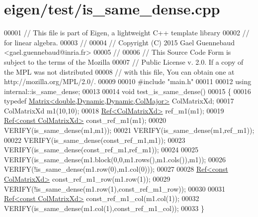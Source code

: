 \hypertarget{eigen_2test_2is__same__dense_8cpp_source}{}\section{eigen/test/is\+\_\+same\+\_\+dense.cpp}
\label{eigen_2test_2is__same__dense_8cpp_source}

\begin{DoxyCode}
00001 \textcolor{comment}{// This file is part of Eigen, a lightweight C++ template library}
00002 \textcolor{comment}{// for linear algebra.}
00003 \textcolor{comment}{//}
00004 \textcolor{comment}{// Copyright (C) 2015 Gael Guennebaud <gael.guennebaud@inria.fr>}
00005 \textcolor{comment}{//}
00006 \textcolor{comment}{// This Source Code Form is subject to the terms of the Mozilla}
00007 \textcolor{comment}{// Public License v. 2.0. If a copy of the MPL was not distributed}
00008 \textcolor{comment}{// with this file, You can obtain one at http://mozilla.org/MPL/2.0/.}
00009 
00010 \textcolor{preprocessor}{#include "main.h"}
00011 
00012 \textcolor{keyword}{using} internal::is\_same\_dense;
00013 
00014 \textcolor{keywordtype}{void} test\_is\_same\_dense()
00015 \{
00016   \textcolor{keyword}{typedef} \hyperlink{group___core___module_class_eigen_1_1_matrix}{Matrix<double,Dynamic,Dynamic,ColMajor>} ColMatrixXd;
00017   ColMatrixXd m1(10,10);
00018   \hyperlink{group___core___module_class_eigen_1_1_ref}{Ref<ColMatrixXd>} ref\_m1(m1);
00019   \hyperlink{group___core___module_class_eigen_1_1_ref}{Ref<const ColMatrixXd>} const\_ref\_m1(m1);
00020   VERIFY(is\_same\_dense(m1,m1));
00021   VERIFY(is\_same\_dense(m1,ref\_m1));
00022   VERIFY(is\_same\_dense(const\_ref\_m1,m1));
00023   VERIFY(is\_same\_dense(const\_ref\_m1,ref\_m1));
00024   
00025   VERIFY(is\_same\_dense(m1.block(0,0,m1.rows(),m1.cols()),m1));
00026   VERIFY(!is\_same\_dense(m1.row(0),m1.col(0)));
00027   
00028   \hyperlink{group___core___module_class_eigen_1_1_ref}{Ref<const ColMatrixXd>} const\_ref\_m1\_row(m1.row(1));
00029   VERIFY(!is\_same\_dense(m1.row(1),const\_ref\_m1\_row));
00030   
00031   \hyperlink{group___core___module_class_eigen_1_1_ref}{Ref<const ColMatrixXd>} const\_ref\_m1\_col(m1.col(1));
00032   VERIFY(is\_same\_dense(m1.col(1),const\_ref\_m1\_col));
00033 \}
\end{DoxyCode}
